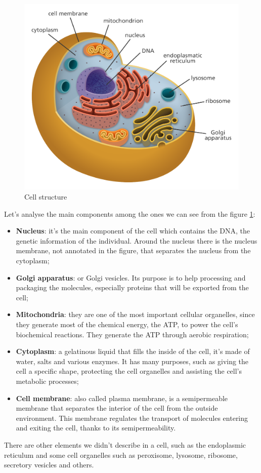 \begin{figure}[h!]
	\includegraphics[scale=.25]{res/proteins_overview/cell_structure.png}
	\centering
	\caption{Cell structure}
	\label{fig:cell-structure}
\end{figure}

Let's analyse the main components among the ones we can see from the figure \ref{fig:cell-structure}:
\begin{itemize}
	\item \textbf{Nucleus}: it's the main component of the cell which contains the DNA, the genetic information of the individual. Around the nucleus there is the nucleus membrane, not annotated in the figure, that separates the nucleus from the cytoplasm;
	\item \textbf{Golgi apparatus}: or Golgi vesicles. Its purpose is to help processing and packaging the molecules, especially proteins that will be exported from the cell;
	\item  \textbf{Mitochondria}: they are one of the most important cellular organelles, since they generate most of the chemical energy, the ATP, to power the cell's biochemical reactions. They generate the ATP through aerobic respiration;
	\item \textbf{Cytoplasm}: a gelatinous liquid that fills the inside of the cell, it's made of water, salts and various enzymes. It has many purposes, such as giving the cell a specific shape, protecting the cell organelles and assisting the cell's metabolic processes;
	\item \textbf{Cell membrane}: also called plasma membrane, is a semipermeable membrane that separates the interior of the cell from the outside environment. This membrane regulates the transport of molecules entering and exiting the cell, thanks to its semipermeability.
\end{itemize}
There are other elements we didn't describe in a cell, such as the endoplasmic reticulum and some cell organelles such as peroxisome, lysosome, ribosome, secretory vesicles and others.
